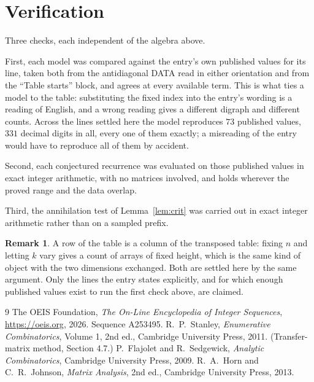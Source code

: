 \documentclass[11pt,a4paper]{article}
\theoremstyle{plain}
\theoremstyle{definition}
\newtheorem{remark}[theorem]{Remark}
\begin{document}
\section{Verification}

Three checks, each independent of the algebra above.

First, each model was compared against the entry's own published values for its line, taken
both from the antidiagonal DATA read in either orientation and from the ``Table starts''
block, and agrees at every available term. This is what ties a model to the table:
substituting the fixed index into the entry's wording is a reading of English, and a wrong
reading gives a different digraph and different counts. Across the lines settled here the
model reproduces $73$ published values, $331$ decimal digits in all, every one of
them exactly; a misreading of the entry would have to reproduce all of them by accident.

Second, each conjectured recurrence was evaluated on those published values in exact
integer arithmetic, with no matrices involved, and holds wherever the proved range and the
data overlap.

Third, the annihilation test of Lemma~\ref{lem:crit} was carried out in exact integer
arithmetic rather than on a sampled prefix.

\begin{remark}
A row of the table is a column of the transposed table: fixing $n$ and letting $k$ vary gives a
count of arrays of fixed height, which is the same kind of object with the two dimensions
exchanged. Both are settled here by the same argument. Only the lines the entry states
explicitly, and for which enough published values exist to run the first check above, are
claimed.
\end{remark}

\begin{thebibliography}{9}
 The OEIS Foundation, \emph{The On-Line Encyclopedia of Integer
Sequences}, \url{https://oeis.org}, 2026. Sequence A253495.
 R.~P.~Stanley, \emph{Enumerative Combinatorics}, Volume 1, 2nd ed.,
Cambridge University Press, 2011. (Transfer-matrix method, Section 4.7.)
 P.~Flajolet and R.~Sedgewick, \emph{Analytic Combinatorics}, Cambridge
University Press, 2009.
 R.~A.~Horn and C.~R.~Johnson, \emph{Matrix Analysis}, 2nd ed., Cambridge
University Press, 2013.
\end{thebibliography}
\end{document}
